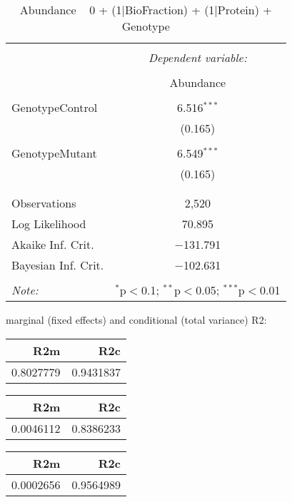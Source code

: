 \documentclass[11pt]{report}
\begin{document}
\begin{table}[!htbp] \centering 
  \caption{Abundance ~ 0 + (1|BioFraction) + (1|Protein) + Genotype} 
  \label{} 
\begin{tabular}{@{\extracolsep{5pt}}lc} 
\\[-1.8ex]\hline 
\hline \\[-1.8ex] 
 & \multicolumn{1}{c}{\textit{Dependent variable:}} \\ 
\cline{2-2} 
\\[-1.8ex] & Abundance \\ 
\hline \\[-1.8ex] 
 GenotypeControl & 6.516$^{***}$ \\ 
  & (0.165) \\ 
  & \\ 
 GenotypeMutant & 6.549$^{***}$ \\ 
  & (0.165) \\ 
  & \\ 
\hline \\[-1.8ex] 
Observations & 2,520 \\ 
Log Likelihood & 70.895 \\ 
Akaike Inf. Crit. & $-$131.791 \\ 
Bayesian Inf. Crit. & $-$102.631 \\ 
\hline 
\hline \\[-1.8ex] 
\textit{Note:}  & \multicolumn{1}{r}{$^{*}$p$<$0.1; $^{**}$p$<$0.05; $^{***}$p$<$0.01} \\ 
\end{tabular} 
\end{table} 
marginal (fixed effects) and conditional (total variance) R2:

\begin{tabular}{r|r}
\hline
R2m & R2c\\
\hline
0.8027779 & 0.9431837\\
\hline
\end{tabular}

\begin{tabular}{r|r}
\hline
R2m & R2c\\
\hline
0.0046112 & 0.8386233\\
\hline
\end{tabular}

\begin{tabular}{r|r}
\hline
R2m & R2c\\
\hline
0.0002656 & 0.9564989\\
\hline
\end{tabular}
\end{document}
